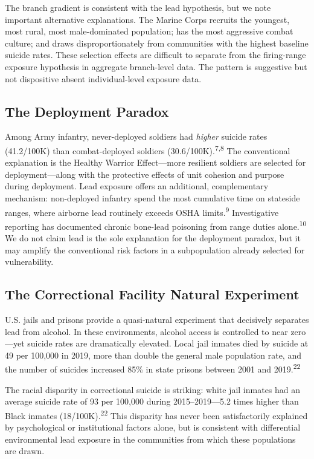 \documentclass[11pt,twocolumn]{article}
\begin{document}
The branch gradient is consistent with the lead hypothesis, but we note important alternative explanations. The Marine Corps recruits the youngest, most rural, most male-dominated population; has the most aggressive combat culture; and draws disproportionately from communities with the highest baseline suicide rates. These selection effects are difficult to separate from the firing-range exposure hypothesis in aggregate branch-level data. The pattern is suggestive but not dispositive absent individual-level exposure data.

\subsection{The Deployment Paradox}

Among Army infantry, never-deployed soldiers had \textit{higher} suicide rates (41.2/100K) than combat-deployed soldiers (30.6/100K).\textsuperscript{7,8} The conventional explanation is the Healthy Warrior Effect---more resilient soldiers are selected for deployment---along with the protective effects of unit cohesion and purpose during deployment. Lead exposure offers an additional, complementary mechanism: non-deployed infantry spend the most cumulative time on stateside ranges, where airborne lead routinely exceeds OSHA limits.\textsuperscript{9} Investigative reporting has documented chronic bone-lead poisoning from range duties alone.\textsuperscript{10} We do not claim lead is the sole explanation for the deployment paradox, but it may amplify the conventional risk factors in a subpopulation already selected for vulnerability.

\subsection{The Correctional Facility Natural Experiment}

U.S. jails and prisons provide a quasi-natural experiment that decisively separates lead from alcohol. In these environments, alcohol access is controlled to near zero---yet suicide rates are dramatically elevated. Local jail inmates died by suicide at 49 per 100,000 in 2019, more than double the general male population rate, and the number of suicides increased 85\% in state prisons between 2001 and 2019.\textsuperscript{22}

The racial disparity in correctional suicide is striking: white jail inmates had an average suicide rate of 93 per 100,000 during 2015--2019---5.2 times higher than Black inmates (18/100K).\textsuperscript{22} This disparity has never been satisfactorily explained by psychological or institutional factors alone, but is consistent with differential environmental lead exposure in the communities from which these populations are drawn.
\end{document}
